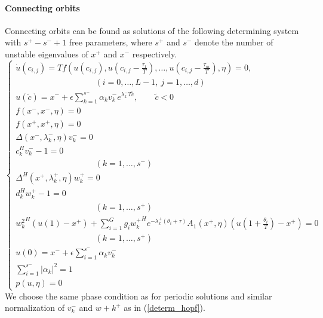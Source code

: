 \documentclass[10pt]{article}
\begin{document}
{\paragraph{Connecting orbits}
Connecting orbits can be found as solutions of the following determining 
system with $s^+-s^-+1$ free parameters, where $s^+$ and $s^-$ denote the 
number of unstable eigenvalues of $x^+$ and $x^-$ respectively. 
\begin{equation}\label{determ_hcli}
\left\{
\begin{array}{l}
\dot{u}(c_{i,j})=
Tf(u(c_{i,j}),u(c_{i,j}-\frac{\tau_1}{T}),\ldots,
u(c_{i,j}-\frac{\tau_m}{T}),\eta)=0, \\
\hspace{4cm}(i=0,\ldots,L-1,\ j=1,\ldots,d) \\ 
u(\tilde{c})=x^{-}+\epsilon
\sum_{k=1}^{s^{-}}\alpha_{k}v_{k}^{-}e^{\lambda_{k}^{-}T\tilde{c}}, \qquad \tilde{c}<0\\
f(x^{-},x^{-},\eta)=0\\
f(x^{+},x^{+},\eta)=0\\
\Delta(x^{-},\lambda_k^-,\eta) v_{k}^{-}=0 \\
c_k^{H}v_{k}^{-}-1=0\\
\hspace{4cm} (k=1,\ldots,s^{-})\\
\Delta^{H}(x^{+},\lambda_k^+,\eta)w_{k}^{+}=0 \\
d_k^{H}w_{k}^{+}-1=0\\
\hspace{4cm} (k=1,\ldots,s^{+})\\
{w_{k}^{2}}^{H}(u(1)-x^{+})+\sum_{i=1}^{G}g_i{w_{k}^{+}}^{H}e^{-\lambda_{k}^{+}
(\theta_i+\tau)}A_{1}(x^{+},\eta)
\left(u(1+\frac{\theta_i}{T})-x^{+}\right)=0\\
\hspace{4cm}( k=1,\ldots,s^+)\\
 u(0)=x^{-}+\epsilon\sum_{i=1}^{s^{-}}\alpha_{k}v_{k}^{-}\\
\sum_{i=1}^{s^-}|\alpha_{k}|^{2}=1\\
p(u,\eta)=0
\end{array}
\right.
\end{equation}
We choose the same phase condition as for periodic solutions
and similar normalization of $v_k^-$ and $w+k^+$ as in (\ref{determ_hopf}).

}
\end{document}

